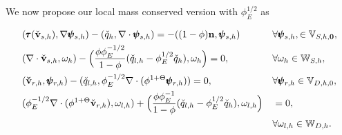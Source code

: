 We now propose our local mass conserved version %
with $\phi_E^{1/2}$ as

\begin{alignat}{2}
		  \label{eq:weak_stokes_mass}
		  &(\pmb{\tau}(\check{\bold{v}}_{s,h}),\nabla \pmb{\psi}_{s,h}) - (\check{q}_h, \nabla \cdot \pmb{\psi}_{s,h}) = -((1-\phi)\bold{n}, \pmb{\psi}_{s,h}) &&\forall\pmb{\psi}_{s,h}, \in \mathbb{V}_{S,h,\mathbf{0}},\\
		  \label{eq:weak_compaction_mass}
		  &(\nabla \cdot \check{\bold{v}}_{s,h}, \omega_h)  - \Big(\frac{\phi\phi_E^{-1/2}}{1-\phi} (\check{q}_{l,h} - \phi_E^{1/2}\check{q}_h), \omega_h \Big) = 0, &&\forall \omega_h \in \mathbb{W}_{S,h},\\
					\label{eq:weak_darcy_mass}
					 &(\bold{\check{v}}_{r,h},\pmb{\psi}_{r,h})  - (\check{q}_{l,h},\phi_E^{-1/2} \nabla \cdot (\phi^{1+\Theta}\pmb{\psi}_{r,h})) = 0, &&\forall \pmb{\psi}_{r,h} \in \mathbb{V}_{D,h,0},\\
					 \nonumber
					 &(\phi_E^{-1/2} \nabla \cdot (\phi^{1+\Theta}\check{\bold{v}}_{r,h}),\omega_{l,h}) + \Big(\frac{\phi\phi^{-1}_E}{1-\phi}(\check{q}_{l,h} - \phi_E^{1/2}\check{q}_h),\omega_{l,h} \Big) &&= 0, \\
					 \label{eq:weak_continuous_mass}
		  &					 &&\forall \omega_{l,h} \in 
		  \mathbb{W}_{D,h}.
\end{alignat}
